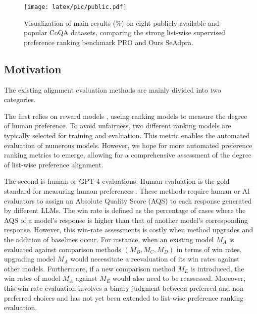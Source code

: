 \begin{figure*}[t]
    \centering
    \texttt{[image: latex/pic/public.pdf]}
    \caption{Visualization of main results (\%) on eight publicly available and popular CoQA datasets, comparing the strong list-wise supervised preference ranking benchmark PRO and Ours SeAdpra.}
    \label{fig::public}
\end{figure*}

\subsection{Motivation}
\label{metric::mot}
The existing alignment evaluation methods are mainly divided into two categories.

The first relies on reward models \cite{song2024preference,liu2024lipo}, useing ranking models to measure the degree of human preference. To avoid unfairness, two different ranking models are typically selected for training and evaluation. This metric enables the automated evaluation of numerous models. However, we hope for more automated preference ranking metrics to emerge, allowing for a comprehensive assessment of the degree of list-wise preference alignment.

The second is human or GPT-4 evaluations. 
Human evaluation is the gold standard for measuring human preferences \cite{zhou2024lima}.
These methods require human or AI evaluators to assign an Absolute Quality Score (AQS) to each response generated by different LLMs.
The win rate\cite{ouyang2022training,rafailov2024direct} is defined as the percentage of cases where the AQS of a model's response is higher than that of another model's corresponding response.
However, this win-rate assessments is costly when method upgrades and the addition of baselines occur.
For instance, when an existing model \(M_A\) is evaluated against comparison methods \((M_B, M_C, M_D)\) in terms of win rates, upgrading model \(M_A\) would necessitate a reevaluation of its win rates against other models. Furthermore, if a new comparison method \(M_E\) is introduced, the win rates of model \(M_A\) against \(M_E\) would also need to be reassessed. 
Moreover, this win-rate evaluation involves a binary judgment between preferred and non-preferred choices and has not yet been extended to list-wise preference ranking evaluation.

